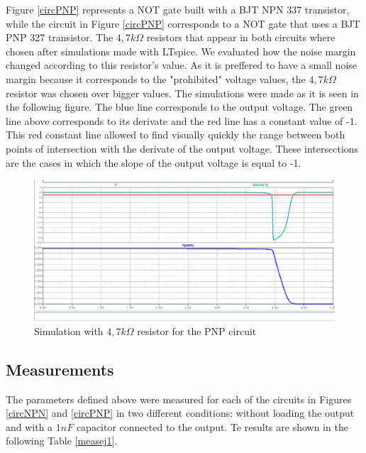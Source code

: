 Figure \ref{circPNP} represents a NOT gate built with a BJT NPN 337 transistor, while the circuit in Figure \ref{circPNP} corresponds to a NOT gate that uses a BJT PNP 327 transistor. The $4,7k{\Omega}$ resistors that appear in both circuits where chosen after simulations made with LTspice. We evaluated how the noise margin changed according to this resistor's value. As it is preffered to have a small noise margin because it corresponds to the "prohibited" voltage values, the $4,7k{\Omega}$ resistor was chosen over bigger values. The simulations were made as it is seen in the following figure. The blue line corresponds to the output voltage. The green line above corresponds to its derivate and the red line has a constant value of -1. This red constant line allowed to find visually quickly the range between both points of intersection with the derivate of the output voltage. These intersections are the cases in which the slope of the output voltage is equal to -1.

\begin{figure}[h!]
\centering
\includegraphics[scale=0.3]{../Exercise1/4k7simulacion}
\caption{\color{cyan}Simulation with $4,7k{\Omega}$ resistor for the PNP circuit}
\label{simpnp}
\end{figure}

\subsection{\color{purple}Measurements}

The parameters defined above were measured for each of the circuits in Figures \ref{circNPN} and \ref{circPNP} in two different conditions: without loading the output and with a $1 nF$ capacitor connected to the output. Te results are shown in the following Table \ref {measej1}. \\

